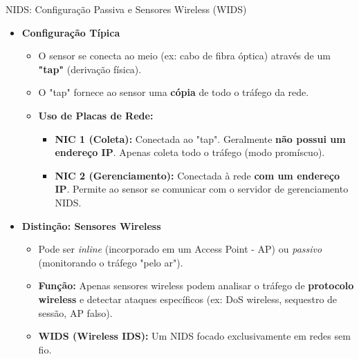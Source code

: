 \begin{frame}{NIDS: Configuração Passiva e Sensores Wireless (WIDS)}
    \begin{itemize}
        \item \textbf{Configuração Típica}
              \begin{itemize}
                  \item O sensor se conecta ao meio (ex: cabo de fibra óptica) através de um \textbf{"tap"} (derivação física).
                  \item O "tap" fornece ao sensor uma \textbf{cópia} de todo o tráfego da rede.
                  \item \textbf{Uso de Placas de Rede:}
                        \begin{itemize}
                            \item \textbf{NIC 1 (Coleta):} Conectada ao "tap". Geralmente \textbf{não possui um endereço IP}. Apenas coleta todo o tráfego (modo promíscuo).
                            \item \textbf{NIC 2 (Gerenciamento):} Conectada à rede \textbf{com um endereço IP}. Permite ao sensor se comunicar com o servidor de gerenciamento NIDS.
                        \end{itemize}
              \end{itemize}

        \item \textbf{Distinção: Sensores Wireless}
              \begin{itemize}
                  \item Pode ser \textit{inline} (incorporado em um Access Point - AP) ou \textit{passivo} (monitorando o tráfego "pelo ar").
                  \item \textbf{Função:} Apenas sensores wireless podem analisar o tráfego de \textbf{protocolo wireless} e detectar ataques específicos (ex: DoS wireless, sequestro de sessão, AP falso).
                  \item \textbf{WIDS (Wireless IDS):} Um NIDS focado exclusivamente em redes sem fio.
              \end{itemize}
    \end{itemize}
\end{frame}

